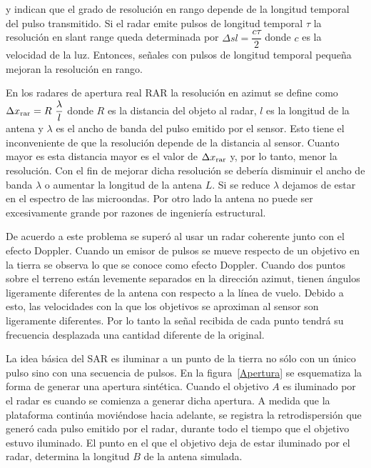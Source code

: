 \citet{Sarmap2009} y \citet{Moreira2013} indican que el grado de resolución en rango depende de la longitud temporal del pulso transmitido. Si el radar emite pulsos de longitud temporal $\tau$ la resolución en slant range queda determinada por $\Delta sl= \dfrac{c \tau}{2}$ donde $c$ es la velocidad de la luz. Entonces, señales con pulsos de longitud temporal pequeña mejoran la resolución en rango.

En los radares de apertura real RAR la resolución en azimut se define como $\Delta x_{\tiny \text{rar}}= R \ \dfrac{\lambda}{l}$ donde $R$ es la distancia del objeto al radar, $l$ es la longitud de la antena y $\lambda$ es el ancho de banda del pulso emitido por el sensor. Esto tiene el inconveniente de que la resolución depende de la distancia al sensor. Cuanto mayor es esta distancia mayor es el valor de $\Delta x_{\tiny \text{rar}}$ y, por lo tanto, menor la resolución. Con el fin de mejorar dicha resolución se debería disminuir el ancho de banda $\lambda$ o aumentar la longitud de la antena $L$. Si se reduce $\lambda$ dejamos de estar en el espectro de las microondas. Por otro lado la antena no puede ser excesivamente grande por razones de ingeniería estructural.

De acuerdo a \citet{Moreira2013} este problema se superó al usar un radar coherente junto con el efecto Doppler. Cuando un emisor de pulsos se mueve respecto de un objetivo en la tierra se observa lo que se conoce como efecto Doppler. Cuando dos puntos sobre el terreno están levemente separados en la dirección azimut, tienen ángulos ligeramente diferentes de la antena con respecto a la línea de vuelo. Debido a esto, las velocidades con la que los objetivos se aproximan al sensor son ligeramente diferentes. Por lo tanto la señal recibida de cada punto tendrá su frecuencia desplazada una cantidad diferente de la original. 

La idea básica del SAR es iluminar a un punto de la tierra no sólo con un único pulso sino con una secuencia de pulsos. En la figura~\ref{Apertura} se esquematiza la forma de generar una apertura sintética. Cuando el objetivo $A$ es iluminado por el radar es cuando se comienza a generar dicha apertura. A medida que la plataforma continúa moviéndose hacia adelante, se registra la retrodispersión que generó cada pulso emitido por el radar, durante todo el tiempo que el objetivo estuvo iluminado. El punto en el que el objetivo deja de estar iluminado por el radar, determina la longitud $B$ de la antena simulada. 

